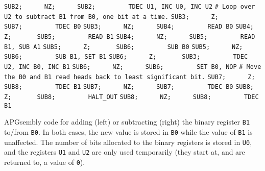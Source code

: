 \begin{apgsembly}
\begin{minipage}[t]{.49\textwidth}
\begin{algorithmic}
			\State \verb|SUB2;      NZ;      SUB2;         TDEC U1, INC U0, INC U2|
			\State \verb||
			\State \verb|# Loop over U2 to subtract B1 from B0, one bit at a time.|
			\State \verb|SUB3;      Z;       SUB7;         TDEC B0|
			\State \verb|SUB3;      NZ;      SUB4;         READ B0|
			\State \verb|SUB4;      Z;       SUB5;         READ B1|
			\State \verb|SUB4;      NZ;      SUB5;         READ B1, SUB A1|
			\State \verb|SUB5;      Z;       SUB6;         SUB B0|
			\State \verb|SUB5;      NZ;      SUB6;         SUB B1, SET B1|
			\State \verb|SUB6;      Z;       SUB3;         TDEC U2, INC B0, INC B1|
			\State \verb|SUB6;      NZ;      SUB6;         SET B0, NOP|
			\State \verb||
			\State \verb|# Move the B0 and B1 read heads back to least significant bit.|
			\State \verb|SUB7;      Z;       SUB8;         TDEC B1|
			\State \verb|SUB7;      NZ;      SUB7;         TDEC B0|
			\State \verb|SUB8;      Z;       SUB8;         HALT_OUT|
			\State \verb|SUB8;      NZ;      SUB8;         TDEC B1|
		\end{algorithmic}
	\end{minipage}
	\caption{APGsembly code for adding (left) or subtracting (right) the binary register \texttt{B1} to/from \texttt{B0}. In both cases, the new value is stored in \texttt{B0} while the value of \texttt{B1} is unaffected. The number of bits allocated to the binary registers is stored in \texttt{U0}, and the registers \texttt{U1} and \texttt{U2} are only used temporarily (they start at, and are returned to, a value of \texttt{0}).}\label{alg:apgsembly_binary_add_sub}
\end{apgsembly}




